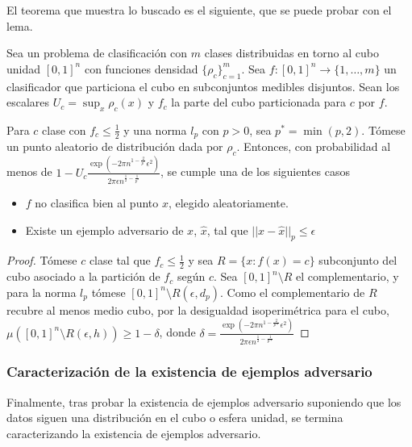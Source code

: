 El teorema que muestra lo buscado es el siguiente, que se puede probar con el lema.

\begin{teorema} \label{teomcubo}
Sea un problema de clasificación con $m$ clases distribuidas en torno al cubo unidad $[0,1]^n$ con funciones densidad $\{\rho_c\}_{c=1}^m$. Sea $f:[0,1]^n \to \{1,\ldots,m\}$ un clasificador que particiona el cubo en subconjuntos medibles disjuntos. Sean los escalares $U_c=\sup_x \rho_c(x)$ y $f_c$ la parte del cubo particionada para $c$ por $f$.

Para $c$ clase con $f_c \leq \frac{1}{2}$ y una norma $l_p$ con $p>0$, sea $p^*=\min(p,2)$. Tómese un punto aleatorio de distribución dada por $\rho_c$. Entonces, con probabilidad al menos de $1 - U_c\frac{\exp(-2 \pi n^{1-\frac{2}{p^*}}\epsilon^2)}{2 \pi \epsilon n^{\frac{1}{2}-\frac{1}{p^*}}}$, se cumple una de los siguientes casos

\begin{itemize}
	\item $f$ no clasifica bien al punto $x$, elegido aleatoriamente.
	\item Existe un ejemplo adversario de $x$, $\hat{x}$, tal que $||x-\hat{x}||_p \leq \epsilon$
\end{itemize}
\end{teorema}

\begin{proof}
Tómese $c$ clase tal que $f_c \leq \frac{1}{2}$ y sea $R=\{x:f(x)=c\}$ subconjunto del cubo asociado a la partición de $f_c$ según $c$. Sea $[0,1]^n \setminus R$ el complementario, y para la norma $l_p$ tómese $[0,1]^n \setminus R(\epsilon,d_p)$. Como el complementario de $R$ recubre al menos medio cubo, por la desigualdad isoperimétrica para el cubo, $\mu([0,1]^n \setminus R(\epsilon,h)) \geq 1-\delta$, donde $\delta=\frac{\exp(-2 \pi n^{1-\frac{2}{p*}} \epsilon^2)}{2 \pi \epsilon n^{\frac{1}{2}-\frac{1}{p*}}}$
\end{proof}

\subsubsection{Caracterización de la existencia de ejemplos adversario}

Finalmente, tras probar la existencia de ejemplos adversario suponiendo que los datos siguen una distribución en el cubo o esfera unidad, se termina caracterizando la existencia de ejemplos adversario.

